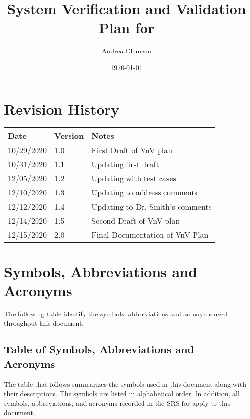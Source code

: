 \documentclass[12pt, titlepage]{article}
\begin{document}
\title{System Verification and Validation 
Plan for \progname{}} 
\author{Andrea Clemeno}
\date{\today}
	
\maketitle


\section{Revision History}

\begin{tabularx}{\textwidth}{p{3cm}p{2cm}X}
\toprule {\bf Date} & {\bf Version} & {\bf Notes}\\
\midrule
10/29/2020  & 1.0 & First Draft of VnV plan\\
10/31/2020  & 1.1 & Updating first draft\\
12/05/2020  & 1.2 & Updating with test cases\\
12/10/2020  & 1.3 & Updating to address comments\\
12/12/2020  & 1.4 & Updating to Dr. Smith's comments\\
12/14/2020  & 1.5 & Second Draft of VnV plan\\
12/15/2020 & 2.0 & Final Documentation of VnV Plan\\
\bottomrule
\end{tabularx}


\newpage

\tableofcontents
\newpage
\listoftables
\newpage

\newpage

\section{Symbols, Abbreviations and Acronyms}

The following table identify the symbols, abbreviations and acronyms used 
throughout this document.
  
\subsection{Table of Symbols, Abbreviations and Acronyms}

The table that follows summarizes the symbols used in this document along with
their descriptions. The symbols are listed in alphabetical order. In addition, 
all symbols, abbreviations, and acronyms recorded in the SRS for \progname{} 
\citep{SRS} apply to this document.
\end{document}
